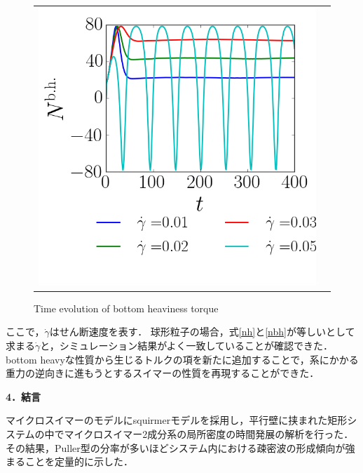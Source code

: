 \documentclass[twocolumns,10pt,a4j]{jarticle}
\begin{document}
\begin{figure}[h]
\begin{tabular}{cc}
      \begin{minipage}[t]{0.44\hsize}
        \includegraphics[width=37truemm]{./images/00.png}
        \vspace{-10truemm}
        \caption{Time evolution of bottom heaviness torque}
        \label{wave}
      \end{minipage}
    \end{tabular}
  \end{figure}

  \noindent
ここで，$\dot{\gamma}$はせん断速度を表す．
球形粒子の場合，式\eqref{nh}と\eqref{nbh}が等しいとして求まる$\dot{\gamma}$と，シミュレーション結果がよく一致していることが確認できた．
bottom heavyな性質から生じるトルクの項を新たに追加することで，系にかかる重力の逆向きに進もうとするスイマーの性質を再現することができた．



  \noindent
  \textbf{\large 4．結言}
  \par
マイクロスイマーのモデルにsquirmerモデルを採用し，平行壁に挟まれた矩形システムの中でマイクロスイマー2成分系の局所密度の時間発展の解析を行った．
その結果，Puller型の分率が多いほどシステム内における疎密波の形成傾向が強まることを定量的に示した．
  \vspace{-7.5truemm}
\end{document}
